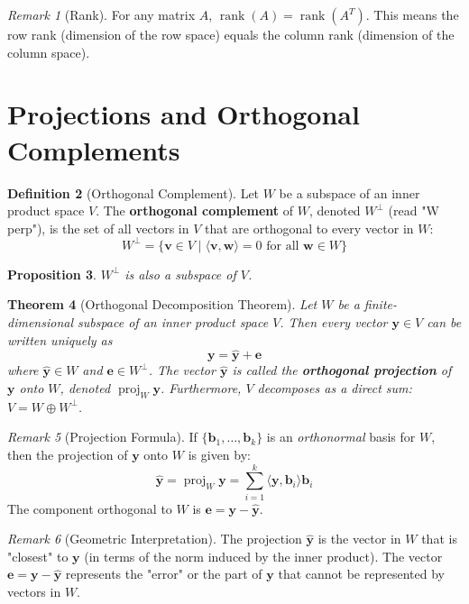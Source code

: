 \documentclass[11pt]{article}
\newtheorem{theorem}{Theorem}[section]
\newtheorem{proposition}[theorem]{Proposition}
\theoremstyle{definition}
\newtheorem{definition}[theorem]{Definition}
\theoremstyle{remark}
\newtheorem{remark}[theorem]{Remark}
\newcommand{\rank}{\operatorname{rank}}
\newcommand{\inner}[2]{\langle #1, #2 \rangle}
\newcommand{\proj}{\operatorname{proj}}
\newcommand{\ortho}{\perp}
\newcommand{\trans}{^T} %
\begin{document}
\begin{remark}[Rank]
For any matrix $A$, $\rank(A) = \rank(A\trans)$. This means the row rank (dimension of the row space) equals the column rank (dimension of the column space).
\end{remark}

\section{Projections and Orthogonal Complements}

\begin{definition}[Orthogonal Complement]
Let $W$ be a subspace of an inner product space $V$. The \textbf{orthogonal complement} of $W$, denoted $W^\ortho$ (read "W perp"), is the set of all vectors in $V$ that are orthogonal to every vector in $W$:
\[ W^\ortho = \{ \mathbf{v} \in V \mid \inner{\mathbf{v}}{\mathbf{w}} = 0 \text{ for all } \mathbf{w} \in W \} \]
\end{definition}

\begin{proposition}
$W^\ortho$ is also a subspace of $V$.
\end{proposition}

\begin{theorem}[Orthogonal Decomposition Theorem]
Let $W$ be a finite-dimensional subspace of an inner product space $V$. Then every vector $\mathbf{y} \in V$ can be written uniquely as
\[ \mathbf{y} = \hat{\mathbf{y}} + \mathbf{e} \]
where $\hat{\mathbf{y}} \in W$ and $\mathbf{e} \in W^\ortho$.
The vector $\hat{\mathbf{y}}$ is called the \textbf{orthogonal projection} of $\mathbf{y}$ onto $W$, denoted $\proj_W \mathbf{y}$. Furthermore, $V$ decomposes as a direct sum: $V = W \oplus W^\ortho$.
\end{theorem}

\begin{remark}[Projection Formula]
If $\{\mathbf{b}_1, \dots, \mathbf{b}_k\}$ is an \textit{orthonormal} basis for $W$, then the projection of $\mathbf{y}$ onto $W$ is given by:
\[ \hat{\mathbf{y}} = \proj_W \mathbf{y} = \sum_{i=1}^k \inner{\mathbf{y}}{\mathbf{b}_i} \mathbf{b}_i \]
The component orthogonal to $W$ is $\mathbf{e} = \mathbf{y} - \hat{\mathbf{y}}$.
\end{remark}

\begin{remark}[Geometric Interpretation]
The projection $\hat{\mathbf{y}}$ is the vector in $W$ that is "closest" to $\mathbf{y}$ (in terms of the norm induced by the inner product). The vector $\mathbf{e} = \mathbf{y} - \hat{\mathbf{y}}$ represents the "error" or the part of $\mathbf{y}$ that cannot be represented by vectors in $W$.
\end{remark}
\end{document}
